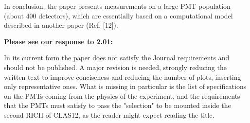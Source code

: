 \documentclass[11pt]{report}
\begin{document}





\begin{tcolorbox}[enlarge top by=2em,colbacktitle=blue!60!white,colframe=black!80!white,left=0pt,right=0pt,top=0pt,bottom=0pt,boxrule=0.3pt,title=\bfseries2.10]
In conclusion, the paper presents measurements on a large PMT population (about 400 detectors), which are essentially based on a computational model described in another paper (Ref. [12]).
\end{tcolorbox}

{\bfseries Please see our response to 2.01:}


\begin{tcolorbox}[enlarge top by=2em,colbacktitle=blue!60!white,colframe=black!80!white,left=0pt,right=0pt,top=0pt,bottom=0pt,boxrule=0.3pt,title=\bfseries2.11]
In its current form the paper does not satisfy the Journal requirements and should not be published. A major revision is needed, strongly reducing the written text to improve conciseness and reducing the number of plots, inserting only representative ones. What is missing in particular is the list of specifications on the PMTs coming from the physics of the experiment, and the requirements that the PMTs must satisfy to pass the "selection" to be mounted inside the second RICH of CLAS12, as the reader might expect reading the title.
\end{tcolorbox}
\end{document}
